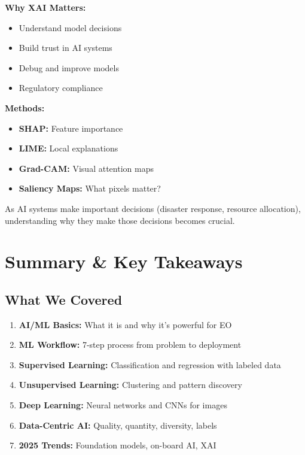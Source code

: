 \documentclass[
  letterpaper,
  DIV=11,
  numbers=noendperiod]{scrartcl}
\providecommand{\tightlist}{%
  \setlength{\itemsep}{0pt}\setlength{\parskip}{0pt}}
\begin{document}
\textbf{Why XAI Matters:}

\begin{itemize}
\tightlist
\item
  Understand model decisions
\item
  Build trust in AI systems
\item
  Debug and improve models
\item
  Regulatory compliance
\end{itemize}

\textbf{Methods:}

\begin{itemize}
\tightlist
\item
  \textbf{SHAP:} Feature importance
\item
  \textbf{LIME:} Local explanations
\item
  \textbf{Grad-CAM:} Visual attention maps
\item
  \textbf{Saliency Maps:} What pixels matter?
\end{itemize}

As AI systems make important decisions (disaster response, resource
allocation), understanding why they make those decisions becomes
crucial.

\section{Summary \& Key Takeaways}\label{summary-key-takeaways}

\subsection{What We Covered}\label{what-we-covered}

\begin{enumerate}
\def\labelenumi{\arabic{enumi}.}
\tightlist
\item
  \textbf{AI/ML Basics:} What it is and why it's powerful for EO
\item
  \textbf{ML Workflow:} 7-step process from problem to deployment
\item
  \textbf{Supervised Learning:} Classification and regression with
  labeled data
\item
  \textbf{Unsupervised Learning:} Clustering and pattern discovery
\item
  \textbf{Deep Learning:} Neural networks and CNNs for images
\item
  \textbf{Data-Centric AI:} Quality, quantity, diversity, labels
\item
  \textbf{2025 Trends:} Foundation models, on-board AI, XAI
\end{enumerate}
\end{document}
